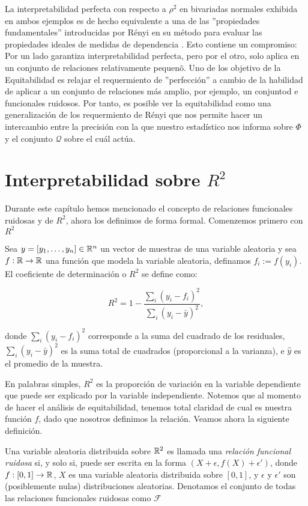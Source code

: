	La interpretabilidad perfecta con respecto a $\rho^2$ en bivariadas normales exhibida en ambos ejemplos es de hecho equivalente a una de las ''propiedades fundamentales'' introducidas por R\'enyi en su m\'etodo para evaluar las propiedades ideales de medidas de dependencia \cite{renyi1959}. Esto contiene un compromiso: Por un lado garantiza interpretabilidad perfecta, pero por el otro, solo aplica en un conjunto de relaciones relativamente pequen\~o. Uno de los objetivo de la Equitabilidad es relajar el requermiento de ''perfecci\'on'' a cambio de la habilidad de aplicar a un conjunto de relaciones m\'as amplio, por ejemplo, un conjuntod e funcionales ruidosos. Por tanto, es posible ver la equitabilidad como una generalizaci\'on de los requermiento de R\'enyi que nos permite hacer un intercambio entre la precisi\'on con la que nuestro estad\'istico nos informa sobre $\Phi$ y el conjunto $\mathcal{Q}$ sobre el cu\'al act\'ua.
	
	\section[Interpretabilidad sobre r2]{Interpretabilidad sobre $R^2$}

	Durante este cap\'itulo hemos mencionado el concepto de relaciones funcionales ruidosas y de $R^2$, ahora los definimos de forma formal. Comenzemos primero con $R^2$
	\begin{defn}[$R^2$]
		Sea $y=[y_1,\dots,y_n]\in\mathbb{R}^n$ un vector de muestras de una variable aleatoria y sea $f:\mathbb{R}\to\mathbb{R}$ una funci\'on que modela la variable aleatoria, definamos $f_i:=f(y_i)$. El coeficiente de determinaci\'on o $R^2$ se define como:

		$$
		R^2 = 1 - \frac{\sum_i(y_i-f_i)^2}{\sum_i(y_i-\bar{y})^2},
		$$

		donde $\sum_i(y_i-f_i)^2$ corresponde a la suma del cuadrado de los residuales, $\sum_i(y_i-\bar{y})^2$ es la suma total de cuadrados (proporcional a la varianza), e $\hat{y}$ es el promedio de la muestra.
	\end{defn}

	En palabras simples, $R^2$ es la proporci\'on de variaci\'on en la variable dependiente que puede ser explicado por la variable independiente. Notemos que al momento de hacer el an\'alisis de equitabilidad, tenemos total claridad de cual es nuestra funci\'on $f$, dado que nosotros definimos la relaci\'on. Veamos ahora la siguiente definici\'on.	
		
	\begin{defn}
		Una variable aleatoria distribuida sobre $\mathbb{R}^2$ es llamada una \textit{relaci\'on funcional ruidosa} si, y solo si, puede ser escrita en la forma $(X+\epsilon, f(X)+\epsilon\prime)$, donde $f:[0,1]\to\mathbb{R}$, $X$ es una variable aleatoria distribuida sobre $[0,1]$, y $\epsilon$ y $\epsilon\prime$ son (posiblemente nulas) distribuciones aleatorias. Denotamos el conjunto de todas las relaciones funcionales ruidosas como $\mathcal{F}$
		\label{ruido_func}
	\end{defn}

